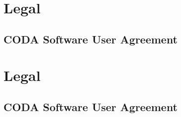 \ifplastex
\section{Legal}
\label{sec:vhdl-legal}

\subsection{CODA Software User Agreement}
\label{sec:vhdl-user-agreement}


\else
  \ifstandalone
  \section{Legal}
  \label{sec:vhdl-legal}

  \subsection{CODA Software User Agreement}
  \label{sec:vhdl-user-agreement}

  
  \else
  \fi
\fi

